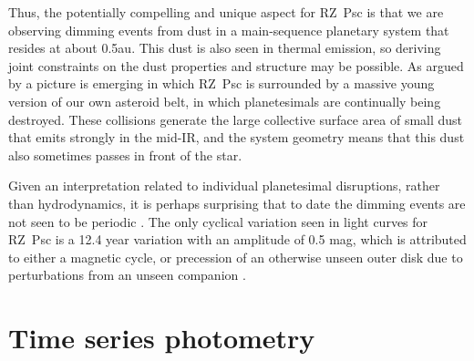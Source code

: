 \documentclass[]{rsos}
\begin{document}
Thus, the potentially compelling and unique aspect for RZ~Psc is that we are observing
dimming events from dust in a main-sequence planetary system that resides at about
0.5au. This dust is also seen in thermal emission, so deriving joint constraints on the
dust properties and structure may be possible. As argued by \cite{2013A&A...553L...1D} a
picture is emerging in which RZ~Psc is surrounded by a massive young version of our own
asteroid belt, in which planetesimals are continually being destroyed. These collisions
generate the large collective surface area of small dust that emits strongly in the
mid-IR, and the system geometry means that this dust also sometimes passes in front of
the star.

Given an interpretation related to individual planetesimal disruptions, rather than
hydrodynamics, it is perhaps surprising that to date the dimming events are not seen to
be periodic \cite{1999AstL...25..243R,2013A&A...553L...1D}. The only cyclical variation
seen in light curves for RZ~Psc is a 12.4 year variation with an amplitude of 0.5 mag,
which is attributed to either a magnetic cycle, or precession of an otherwise unseen
outer disk due to perturbations from an unseen companion \cite{2013A&A...553L...1D}.

\section{Time series photometry}\label{s:data}
\end{document}
